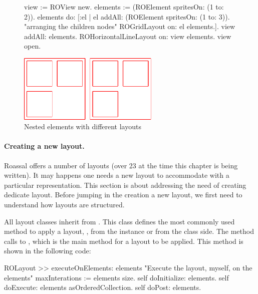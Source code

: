 \documentclass[a4paper,10pt,twoside]{book}
\begin{document}
\begin{figure}[H]
      \begin{minipage}[t]{0.61\textwidth}
      \vspace{0pt}
     \begin{code}{}
view := ROView new.
elements := (ROElement spritesOn: (1 to: 2)).
elements 
	do: [:el | el addAll: (ROElement spritesOn: (1 to: 3)). 
	           "arranging the children nodes"
			   ROGridLayout on: el elements.].			   
view addAll: elements.
ROHorizontalLineLayout on: view elements.
view open.
  \end{code}
   \end{minipage}
   \hfill
   \begin{minipage}[t]{0.5\textwidth}
      \vspace{0pt}\raggedright
       \centering
		\includegraphics[width=0.6\textwidth]{nestedLayout}
   \end{minipage}
\label{fig:nestedLayout}
\caption{Nested elements with different layouts }
\end{figure} 


\paragraph{Creating a new layout.}
Roassal offers a number of layouts (over 23 at the time this chapter is being written). It may happens one needs a new layout to accommodate with a particular representation. This section is about addressing the need of creating dedicate layout.
Before jumping in the creation a new layout, we first need to understand how layouts are structured.

All layout classes inherit from . 
This class defines the most commonly used method to apply a layout, , from the instance or from the class side. The method  calls to , which is the main method for a layout to be applied. This method is shown in the following code:

\begin{code}{}
ROLayout >> executeOnElements: elements 
	"Execute the layout, myself, on the elements"	
	maxInterations := elements size.
	self doInitialize: elements.
	self doExecute: elements asOrderedCollection.
	self doPost: elements.
\end{code}
\end{document}
